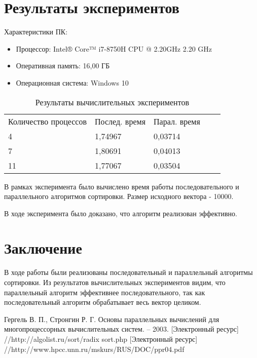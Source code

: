 \documentclass{report}
\begin{document}
\section*{Результаты экспериментов}
Характеристики ПК:
\begin{itemize}
    \item Процессор: Intel® Core™ i7-8750H CPU @ 2.20GHz 2.20 GHz
\end{itemize}
\begin{itemize}
    \item Оперативная память: 16,00 ГБ
\end{itemize}
\begin{itemize}
    \item Операционная система: Windows 10
\end{itemize}
\begin{table}[!h]
\caption{Результаты вычислительных экспериментов}
\centering
\begin{tabular}{lllll}
Количество процессов & Послед. время & Парал. время\\
4  & 1,74967 & 0,03714\\
7 & 1,80691 & 0,04013\\
11  & 1,77067 & 0,03504\\
\end{tabular}
\end{table}
\par
В рамках эксперимента было вычислено время работы последовательного и параллельного алгоритмов сортировки. Размер исходного вектора - 10000.
\par
В ходе эксперимента было доказано, что алгоритм реализован эффективно.
\newpage

\section*{Заключение}
В ходе работы были реализованы последовательный и параллельный алгоритмы сортировки. Из результатов вычислительных экспериментов видим, что параллельный алгоритм эффективнее последовательного, так как последовательный алгоритм обрабатывает весь вектор целиком.
\newpage

\begin{thebibliography}{1}
Гергель В. П., Стронгин Р. Г. Основы параллельных вычислений для многопроцессорных вычислительных систем. – 2003.
 [Электронный ресурс] //http://algolist.ru/sort/radix sort.php
 [Электронный ресурс] //http://www.hpcc.unn.ru/mskurs/RUS/DOC/ppr04.pdf
\end{thebibliography}
\newpage
\end{document}
